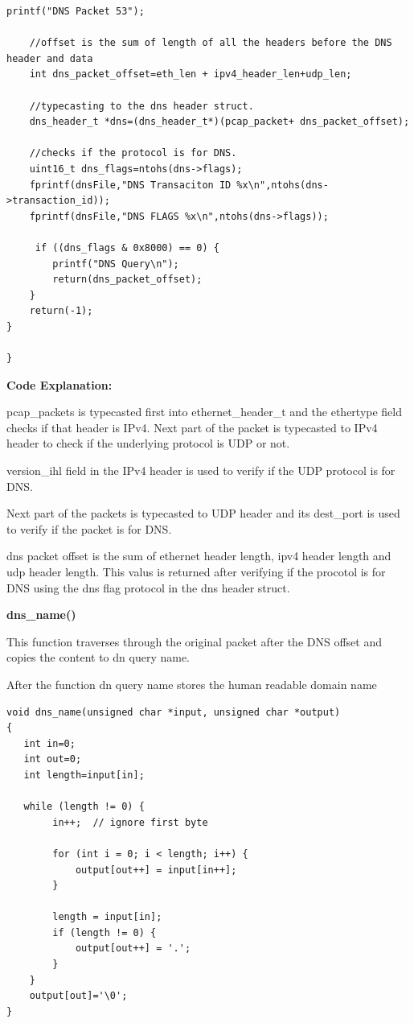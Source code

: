 \documentclass[12pt, a4paper]{report}
\begin{document}
\begin{lstlisting}[caption={Parsing through the packet.}]
    printf("DNS Packet 53");
    
    //offset is the sum of length of all the headers before the DNS header and data
    int dns_packet_offset=eth_len + ipv4_header_len+udp_len;

    //typecasting to the dns header struct.
    dns_header_t *dns=(dns_header_t*)(pcap_packet+ dns_packet_offset);

    //checks if the protocol is for DNS.
    uint16_t dns_flags=ntohs(dns->flags);
    fprintf(dnsFile,"DNS Transaciton ID %x\n",ntohs(dns->transaction_id));
    fprintf(dnsFile,"DNS FLAGS %x\n",ntohs(dns->flags));

     if ((dns_flags & 0x8000) == 0) {
        printf("DNS Query\n");
        return(dns_packet_offset);
    } 
    return(-1);
}

}

\end{lstlisting}

\textbf{Code Explanation: }

pcap\_packets is typecasted first into ethernet\_header\_t and the ethertype field checks if that header is IPv4.
Next part of the packet is typecasted to IPv4 header to check if the underlying protocol is UDP or not.

version\_ihl field in the IPv4 header is used to verify if the UDP protocol is for DNS.

Next part of the packets is typecasted to UDP header and its dest\_port is used to verify if the packet is for DNS.

dns packet offset is the sum of ethernet header length, ipv4 header length and udp header length. This valus is returned after verifying if the procotol is for DNS using the dns flag protocol in the dns header struct.

\textbf{dns\_name()}

This function traverses through the original packet after the DNS offset and copies the content to dn query name.

After the function dn query name stores the human readable domain name


\begin{lstlisting}[caption={copying the domain name.}]
void dns_name(unsigned char *input, unsigned char *output) 
{
   int in=0;
   int out=0;
   int length=input[in];

   while (length != 0) {
        in++;  // ignore first byte
        
        for (int i = 0; i < length; i++) {
            output[out++] = input[in++];
        }

        length = input[in]; 
        if (length != 0) {
            output[out++] = '.'; 
        }
    }
    output[out]='\0';
}

\end{lstlisting}
\end{document}
